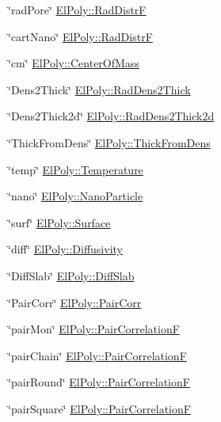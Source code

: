 \begin{DoxyItemize}
\item \char`\"{}rad\+Pore\char`\"{} \hyperlink{classElPoly_aff852b942203d47f2e21e2616537cbdd}{El\+Poly\+::\+Rad\+DistrF} 
\item \char`\"{}cart\+Nano\char`\"{} \hyperlink{classElPoly_aff852b942203d47f2e21e2616537cbdd}{El\+Poly\+::\+Rad\+DistrF} 
\item \char`\"{}cm\char`\"{} \hyperlink{classElPoly_a59529de9a660df4734a218130963ae25}{El\+Poly\+::\+Center\+Of\+Mass} 
\item \char`\"{}\+Dens2\+Thick\char`\"{} \hyperlink{classElPoly_a7c40fb501bdadab09ee7cf8d99259299}{El\+Poly\+::\+Rad\+Dens2\+Thick} 
\item \char`\"{}\+Dens2\+Thick2d\char`\"{} \hyperlink{classElPoly_ad5ab39cdaa856caea3463819b436e7b9}{El\+Poly\+::\+Rad\+Dens2\+Thick2d} 
\item \char`\"{}\+Thick\+From\+Dens\char`\"{} \hyperlink{classElPoly_abcf175509352ac9dd90cb8ad96494219}{El\+Poly\+::\+Thick\+From\+Dens} 
\item \char`\"{}temp\char`\"{} \hyperlink{classElPoly_ad0651bcc7574507f16c1998b57822bdd}{El\+Poly\+::\+Temperature} 
\item \char`\"{}nano\char`\"{} \hyperlink{classElPoly_af9a89c5f8dc4c7274ec5e00ff4db78bb}{El\+Poly\+::\+Nano\+Particle} 
\item \char`\"{}surf\char`\"{} \hyperlink{classElPoly_a52844d3cee2d60eb47889fb021e10fc8}{El\+Poly\+::\+Surface} 
\item \char`\"{}diff\char`\"{} \hyperlink{classElPoly_a2f4aa8dc1e4dce0dc8fcb1d4b161757b}{El\+Poly\+::\+Diffusivity} 
\item \char`\"{}\+Diff\+Slab\char`\"{} \hyperlink{classElPoly_abf879a7d0b86a5eed8a5be87dc741200}{El\+Poly\+::\+Diff\+Slab} 
\item \char`\"{}\+Pair\+Corr\char`\"{} \hyperlink{classElPoly_a56b4b9780b4f84eb1713ca48b49fbbb2}{El\+Poly\+::\+Pair\+Corr} 
\item \char`\"{}pair\+Mon\char`\"{} \hyperlink{classElPoly_a7a3305d9ff38757faf367ced9abf89f0}{El\+Poly\+::\+Pair\+CorrelationF} 
\item \char`\"{}pair\+Chain\char`\"{} \hyperlink{classElPoly_a7a3305d9ff38757faf367ced9abf89f0}{El\+Poly\+::\+Pair\+CorrelationF} 
\item \char`\"{}pair\+Round\char`\"{} \hyperlink{classElPoly_a7a3305d9ff38757faf367ced9abf89f0}{El\+Poly\+::\+Pair\+CorrelationF} 
\item \char`\"{}pair\+Square\char`\"{} \hyperlink{classElPoly_a7a3305d9ff38757faf367ced9abf89f0}{El\+Poly\+::\+Pair\+CorrelationF} 

\end{DoxyItemize}

